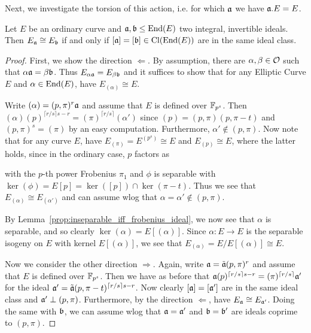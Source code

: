 Next, we investigate the torsion of this action, i.e. for which $\mathfrak{a}$ we have $\mathfrak{a}.E = E$.
\begin{lemma}
    Let $E$ be an ordinary curve and $\mathfrak{a}, \mathfrak{b} \leq \mathrm{End}(E)$ two integral, invertible ideals.
    Then $E_{\mathfrak{a}} \cong E_{\mathfrak{b}}$ if and only if $[\mathfrak{a}] = [\mathfrak{b}] \in \mathrm{Cl}(\mathrm{End}(E))$ are in the same ideal class.
\end{lemma}
\begin{proof}
    First, we show the direction $\Leftarrow$.
    By assumption, there are $\alpha, \beta \in \mathcal{O}$ such that $\alpha\mathfrak{a} = \beta\mathfrak{b}$.
    Thus $E_{\alpha\mathfrak{a}} = E_{\beta\mathfrak{b}}$ and it suffices to show that for any Elliptic Curve $E$ and $\alpha \in \mathrm{End}(E)$, have $E_{(\alpha)} \cong E$.

    Write $(\alpha) = (p, \pi)^r \mathfrak{a}$ and assume that $E$ is defined over $\mathbb{F}_{p^s}$.
    Then $(\alpha)(p)^{\lceil r/s \rceil s - r} = (\pi)^{\lceil r/s \rceil}(\alpha')$ since $(p) = (p, \pi)(p, \pi - t)$ and $(p, \pi)^s = (\pi)$ by an easy computation.
    Furthermore, $\alpha' \notin (p, \pi)$.
    Now note that for any curve $E$, have $E_{(\pi)} = E^{(p^s)} \cong E$ and $E_{(p)} \cong E$, where the latter holds, since in the ordinary case, $p$ factors as
    \begin{center}
    \end{center}
    with the $p$-th power Frobenius $\pi_1$ and $\phi$ is separable with $\ker(\phi) = E[p] = \ker([p]) \cap \ker(\pi - t)$.
    Thus we see that $E_{(\alpha)} \cong E_{(\alpha')}$ and can assume wlog that $\alpha = \alpha' \notin (p, \pi)$.

    By Lemma~\ref{prop:inseparable_iff_frobenius_ideal}, we now see that $\alpha$ is separable, and so clearly $\ker(\alpha) = E[(\alpha)]$.
    Since $\alpha: E \to E$ is the separable isogeny on $E$ with kernel $E[(\alpha)]$, we see that $E_{(\alpha)} = E/E[(\alpha)] \cong E$.

    Now we consider the other direction $\Rightarrow$.
    Again, write $\mathfrak{a} = \tilde{\mathfrak{a}}(p, \pi)^r$ and assume that $E$ is defined over $\mathbb{F}_{p^s}$.
    Then we have as before that $\mathfrak{a} (p)^{\lceil r/s \rceil s - r} = (\pi)^{\lceil r/s \rceil} \mathfrak{a}'$ for the ideal $\mathfrak{a}' = \tilde{\mathfrak{a}} (p, \pi - t)^{\lceil r/s \rceil s - r}$.
    Now clearly $[\mathfrak{a}] = [\mathfrak{a}']$ are in the same ideal class and $\mathfrak{a}' \perp (p, \pi)$.
    Furthermore, by the direction $\Leftarrow$, have $E_{\mathfrak{a}} \cong E_{\mathfrak{a}'}$.
    Doing the same with $\mathfrak{b}$, we can assume wlog that $\mathfrak{a} = \mathfrak{a}'$ and $\mathfrak{b} = \mathfrak{b}'$ are ideals coprime to $(p, \pi)$.


\end{proof}
